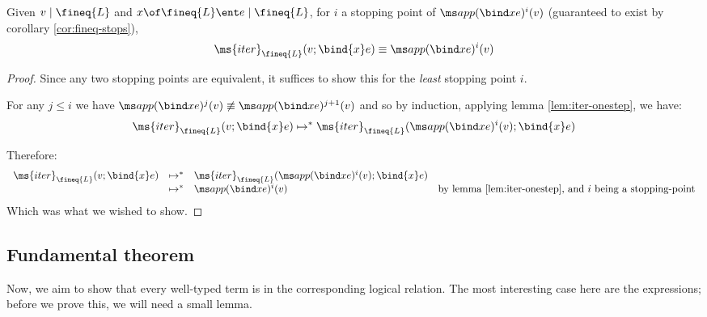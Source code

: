 \documentclass{article}
\newcommand{\iter}[4]{\ms{iter}_{#1}({#2}; \bind{#3}#4)}
\newcommand{\step}{\mapsto}
\newcommand{\steps}{\step^*}
\newcommand{\lr}[2]{#2\mathrel{|}#1}
\newcommand{\lrcx}[3]{#1 \ent \lr{#2}{#3}}
\begin{document}
\begin{theorem}\label{thm:iter-stops}
  Given $\lr{\fineq{L}}{v}$ and $\lrcx{x\of\fineq{L}}{\fineq{L}}{e}$, for $i$ a
  stopping point of $\nthapp{x}{e}{i}{v}$ (guaranteed to exist by corollary
  \ref{cor:fineq-stops}),
  \[ \iter{\fineq{L}}{v}{x}{e} \equiv \nthapp{x}{e}{i}{v} \]
\end{theorem}
\begin{proof}
  Since any two stopping points are equivalent, it suffices to show this for the
  \emph{least} stopping point $i$.

  For any $j \le i$ we have $\nthapp{x}{e}{j}{v} \not\equiv
  \nthapp{x}{e}{j+1}{v}$ and so by induction, applying lemma
  \ref{lem:iter-onestep}, we have:
  \[
  \iter{\fineq{L}}{v}{x}{e} \steps
  \iter{\fineq{L}}{\nthapp{x}{e}{i}{v}}{x}{e}
  \]

  Therefore:
  \[
  \begin{array}{rlll}
    \iter{\fineq{L}}{v}{x}{e}
    &\steps& \iter{\fineq{L}}{\nthapp{x}{e}{i}{v}}{x}{e}\\
    &\steps& \nthapp{x}{e}{i}{v}
    & \text{by lemma \ref{lem:iter-onestep}, and $i$ being a stopping-point}
  \end{array}
  \]
  Which was what we wished to show.
\end{proof}


\subsection{Fundamental theorem}

Now, we aim to show that every well-typed term is in the corresponding logical
relation. The most interesting case here are the  expressions; before we
prove this, we will need a small lemma.
\end{document}
